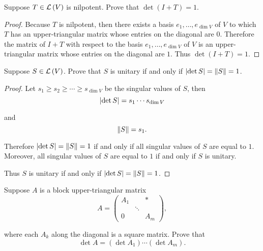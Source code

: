 \begin{exercise}\label{chapter9:sectionC:exercise3}
    Suppose $T\in\mathcal{L}\left({V}\right)$ is nilpotent. Prove that $\det(I + T) = 1$.
\end{exercise}

\begin{proof}
    Because $T$ is nilpotent, then there exists a basis $e_{1}, \ldots, e_{\dim V}$ of $V$ to which $T$ has an upper-triangular matrix whose entries on the diagonal are $0$. Therefore the matrix of $I + T$ with respect to the basis $e_{1}, \ldots, e_{\dim V}$ of $V$ is an upper-triangular matrix whose entries on the diagonal are $1$. Thus $\det(I + T) = 1$.
\end{proof}
\newpage

\begin{exercise}\label{chapter9:sectionC:exercise4}
    Suppose $S\in\mathcal{L}\left({V}\right)$. Prove that $S$ is unitary if and only if $\left\vert{\det S}\right\vert = \left\Vert{S}\right\Vert = 1$.
\end{exercise}

\begin{proof}
    Let $s_{1}\geq s_{2}\geq \cdots \geq s_{\dim V}$ be the singular values of $S$, then
    \[
        \left\vert{\det S}\right\vert = s_{1}\cdots s_{\dim V}
    \]

    and
    \[
        \left\Vert{S}\right\Vert = s_{1}.
    \]

    Therefore $\left\vert{\det S}\right\vert = \left\Vert{S}\right\Vert = 1$ if and only if all singular values of $S$ are equal to $1$. Moreover, all singular values of $S$ are equal to $1$ if and only if $S$ is unitary.

    Thus $S$ is unitary if and only if $\left\vert{\det S}\right\vert = \left\Vert{S}\right\Vert = 1$.
\end{proof}
\newpage

\begin{exercise}\label{chapter9:sectionC:exercise5}
    Suppose $A$ is a block upper-triangular matrix
    \[
        A = \begin{pmatrix}
            A_{1} &        & *     \\
                  & \ddots &       \\
            0     &        & A_{m}
        \end{pmatrix},
    \]

    where each $A_{k}$ along the diagonal is a square matrix. Prove that
    \[
        \det A = (\det A_{1})\cdots (\det A_{m}).
    \]
\end{exercise}

